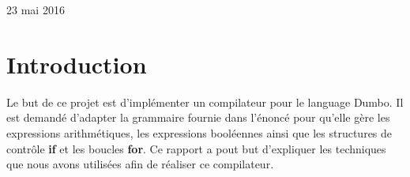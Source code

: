 \documentclass[a4paper,10pt]{article}
\begin{document}
\begin{titlepage}

{\large 23 mai 2016}\\[3cm] %


 

\vfill %

\end{titlepage}

\newpage
\tableofcontents
\newpage

\section{Introduction}

Le but de ce projet est d'implémenter un compilateur pour le language \textrm{Dumbo}. Il est demandé d'adapter la grammaire fournie dans l'énoncé pour 
qu'elle gère les expressions arithmétiques, les expressions booléennes ainsi que les structures de contrôle \textbf{if} et les boucles \textbf{for}.
Ce rapport a pout but d'expliquer les techniques que nous avons utilisées afin de réaliser ce compilateur.
\end{document}
